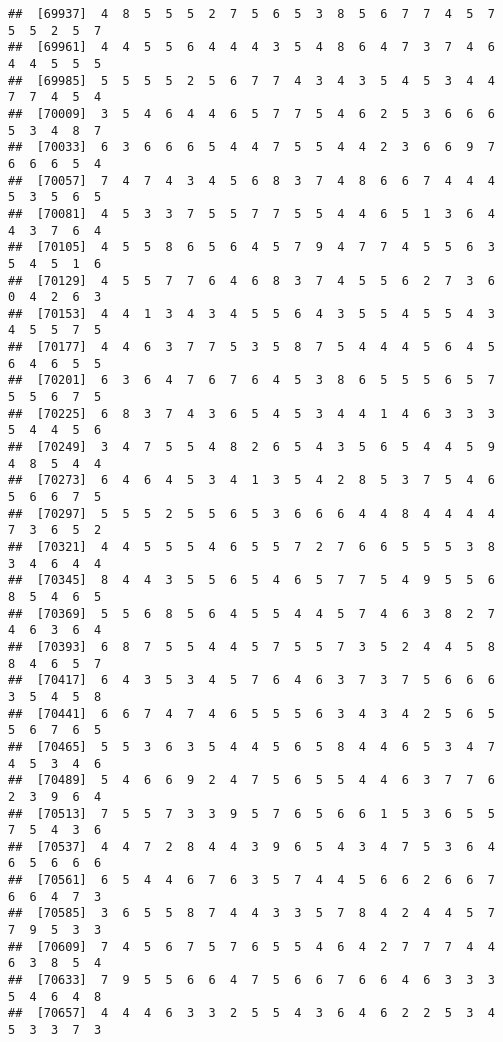 \documentclass[
]{book}
\begin{document}
\begin{verbatim}
##  [69937]  4  8  5  5  5  2  7  5  6  5  3  8  5  6  7  7  4  5  7  5  5  2  5  7
##  [69961]  4  4  5  5  6  4  4  4  3  5  4  8  6  4  7  3  7  4  6  4  4  5  5  5
##  [69985]  5  5  5  5  2  5  6  7  7  4  3  4  3  5  4  5  3  4  4  7  7  4  5  4
##  [70009]  3  5  4  6  4  4  6  5  7  7  5  4  6  2  5  3  6  6  6  5  3  4  8  7
##  [70033]  6  3  6  6  6  5  4  4  7  5  5  4  4  2  3  6  6  9  7  6  6  6  5  4
##  [70057]  7  4  7  4  3  4  5  6  8  3  7  4  8  6  6  7  4  4  4  5  3  5  6  5
##  [70081]  4  5  3  3  7  5  5  7  7  5  5  4  4  6  5  1  3  6  4  4  3  7  6  4
##  [70105]  4  5  5  8  6  5  6  4  5  7  9  4  7  7  4  5  5  6  3  5  4  5  1  6
##  [70129]  4  5  5  7  7  6  4  6  8  3  7  4  5  5  6  2  7  3  6  0  4  2  6  3
##  [70153]  4  4  1  3  4  3  4  5  5  6  4  3  5  5  4  5  5  4  3  4  5  5  7  5
##  [70177]  4  4  6  3  7  7  5  3  5  8  7  5  4  4  4  5  6  4  5  6  4  6  5  5
##  [70201]  6  3  6  4  7  6  7  6  4  5  3  8  6  5  5  5  6  5  7  5  5  6  7  5
##  [70225]  6  8  3  7  4  3  6  5  4  5  3  4  4  1  4  6  3  3  3  5  4  4  5  6
##  [70249]  3  4  7  5  5  4  8  2  6  5  4  3  5  6  5  4  4  5  9  4  8  5  4  4
##  [70273]  6  4  6  4  5  3  4  1  3  5  4  2  8  5  3  7  5  4  6  5  6  6  7  5
##  [70297]  5  5  5  2  5  5  6  5  3  6  6  6  4  4  8  4  4  4  4  7  3  6  5  2
##  [70321]  4  4  5  5  5  4  6  5  5  7  2  7  6  6  5  5  5  3  8  3  4  6  4  4
##  [70345]  8  4  4  3  5  5  6  5  4  6  5  7  7  5  4  9  5  5  6  8  5  4  6  5
##  [70369]  5  5  6  8  5  6  4  5  5  4  4  5  7  4  6  3  8  2  7  4  6  3  6  4
##  [70393]  6  8  7  5  5  4  4  5  7  5  5  7  3  5  2  4  4  5  8  8  4  6  5  7
##  [70417]  6  4  3  5  3  4  5  7  6  4  6  3  7  3  7  5  6  6  6  3  5  4  5  8
##  [70441]  6  6  7  4  7  4  6  5  5  5  6  3  4  3  4  2  5  6  5  5  6  7  6  5
##  [70465]  5  5  3  6  3  5  4  4  5  6  5  8  4  4  6  5  3  4  7  4  5  3  4  6
##  [70489]  5  4  6  6  9  2  4  7  5  6  5  5  4  4  6  3  7  7  6  2  3  9  6  4
##  [70513]  7  5  5  7  3  3  9  5  7  6  5  6  6  1  5  3  6  5  5  7  5  4  3  6
##  [70537]  4  4  7  2  8  4  4  3  9  6  5  4  3  4  7  5  3  6  4  6  5  6  6  6
##  [70561]  6  5  4  4  6  7  6  3  5  7  4  4  5  6  6  2  6  6  7  6  6  4  7  3
##  [70585]  3  6  5  5  8  7  4  4  3  3  5  7  8  4  2  4  4  5  7  7  9  5  3  3
##  [70609]  7  4  5  6  7  5  7  6  5  5  4  6  4  2  7  7  7  4  4  6  3  8  5  4
##  [70633]  7  9  5  5  6  6  4  7  5  6  6  7  6  6  4  6  3  3  3  5  4  6  4  8
##  [70657]  4  4  4  6  3  3  2  5  5  4  3  6  4  6  2  2  5  3  4  5  3  3  7  3

\end{verbatim}
\end{document}

